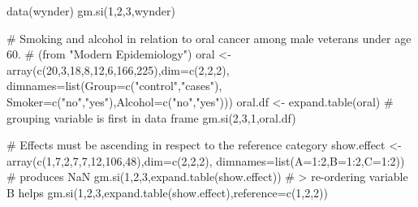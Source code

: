 \begin{Examples}
\begin{ExampleCode}
  data(wynder)
  gm.si(1,2,3,wynder)

  # Smoking and alcohol in relation to oral cancer among male veterans under age 60.
  # (from "Modern Epidemiology")
  oral <- array(c(20,3,18,8,12,6,166,225),dim=c(2,2,2), 
            dimnames=list(Group=c("control","cases"),
            Smoker=c("no","yes"),Alcohol=c("no","yes")))
  oral.df <- expand.table(oral)
  # grouping variable is first in data frame
  gm.si(2,3,1,oral.df)
  
  # Effects must be ascending in respect to the reference category
  show.effect <- array(c(1,7,2,7,7,12,106,48),dim=c(2,2,2),
                        dimnames=list(A=1:2,B=1:2,C=1:2))
  # produces NaN
  gm.si(1,2,3,expand.table(show.effect))
  # > re-ordering variable B helps
  gm.si(1,2,3,expand.table(show.effect),reference=c(1,2,2))

\end{ExampleCode}
\end{Examples}

